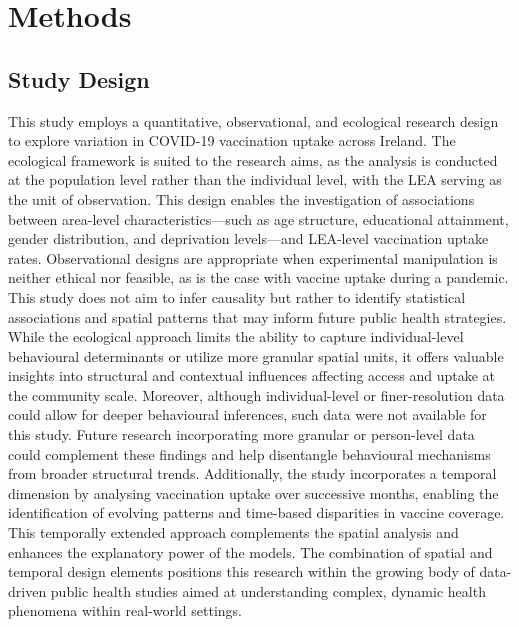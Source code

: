 \documentclass{article}
\begin{document}
\section{Methods}\label{methods}

\subsection{Study Design}\label{study-design}

This study employs a quantitative, observational, and ecological
research design to explore variation in COVID-19 vaccination uptake
across Ireland. The ecological framework is suited to the research aims,
as the analysis is conducted at the population level rather than the
individual level, with the LEA serving as the unit of observation. This
design enables the investigation of associations between area-level
characteristics---such as age structure, educational attainment, gender
distribution, and deprivation levels---and LEA-level vaccination uptake
rates. Observational designs are appropriate when experimental
manipulation is neither ethical nor feasible, as is the case with
vaccine uptake during a pandemic. This study does not aim to infer
causality but rather to identify statistical associations and spatial
patterns that may inform future public health strategies. While the
ecological approach limits the ability to capture individual-level
behavioural determinants or utilize more granular spatial units, it
offers valuable insights into structural and contextual influences
affecting access and uptake at the community scale. Moreover, although
individual-level or finer-resolution data could allow for deeper
behavioural inferences, such data were not available for this study.
Future research incorporating more granular or person-level data could
complement these findings and help disentangle behavioural mechanisms
from broader structural trends. Additionally, the study incorporates a
temporal dimension by analysing vaccination uptake over successive
months, enabling the identification of evolving patterns and time-based
disparities in vaccine coverage. This temporally extended approach
complements the spatial analysis and enhances the explanatory power of
the models. The combination of spatial and temporal design elements
positions this research within the growing body of data-driven public
health studies aimed at understanding complex, dynamic health phenomena
within real-world settings.
\end{document}
